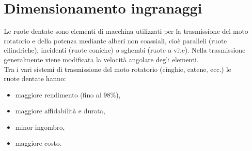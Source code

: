 \section{Dimensionamento ingranaggi}
Le ruote dentate sono elementi di macchina utilizzati per la trasmissione del moto rotatorio e della potenza mediante alberi non coassiali, cioè paralleli (ruote cilindriche), incidenti (ruote coniche) o sghembi (ruote a vite). Nella trasmissione generalmente viene modificata la velocità angolare degli elementi.\\
Tra i vari sistemi di trasmissione del moto rotatorio (cinghie, catene, ecc.) le ruote dentate hanno:
\begin{itemize}
    \item maggiore rendimento (fino al 98\%),
    \item maggiore affidabilità e durata,
    \item minor ingombro,
    \item maggiore costo. 
\end{itemize}
